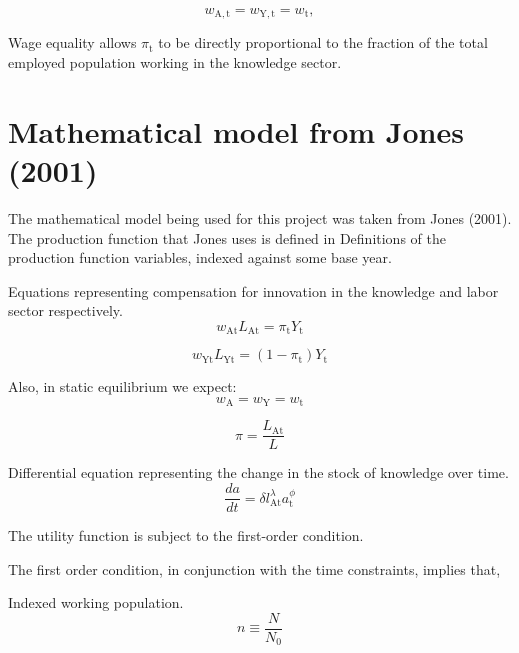 \documentclass[letterpaper,12pt]{article}
\begin{document}
\begin{equation} \label{eq:wage_equality}
w_\mathrm{A,t} = w_\mathrm{Y,t} = w_\mathrm{t},
\end{equation}

Wage equality allows $\pi_\mathrm{t}$ to be directly proportional to the fraction of the total employed population working in the knowledge sector.


\section{Mathematical model from Jones (2001)}

The mathematical model being used for this project was taken from Jones (2001). The production function that Jones uses is defined in 
Definitions of the production function variables, indexed against some base year.

Equations representing compensation for innovation in the knowledge and labor sector respectively.
\begin{equation}
w_\mathrm{At} L_\mathrm{At} = \pi_\mathrm{t} Y_\mathrm{t}
\end{equation}

\begin{equation}
w_\mathrm{Yt} L_\mathrm{Yt} = (1-\pi_\mathrm{t})Y_\mathrm{t}
\end{equation}

Also, in static equilibrium we expect:
\begin{equation}
w_\mathrm{A} = w_\mathrm{Y} = w_\mathrm{t}
\end{equation}

\begin{equation}
\pi = \frac{L_\mathrm{At}}{L}
\end{equation}

Differential equation representing the change in the stock of knowledge over time.
\begin{equation} \label{eq:da_dt}
\frac{da}{dt} = \delta l_\mathrm{At}^\lambda a_\mathrm{t}^\phi
\end{equation}

The utility function is subject to the first-order condition.


The first order condition, in conjunction with the time constraints, implies that,

Indexed working population.
\begin{equation}
n \equiv \frac{N}{N_\mathrm{0}}
\end{equation}
\end{document}
